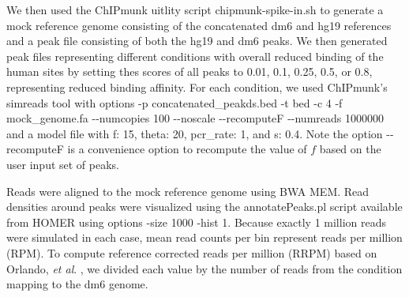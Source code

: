 \documentclass[12pt]{article}
\begin{document}
We then used the ChIPmunk uitlity script chipmunk-spike-in.sh to generate a mock reference genome consisting of the concatenated dm6 and hg19 references and a peak file consisting of both the hg19 and dm6 peaks. We then generated peak files representing different conditions with overall reduced binding of the human sites by setting thes scores of all peaks to 0.01, 0.1, 0.25, 0.5, or 0.8, representing reduced binding affinity.
For each condition, we used ChIPmunk's simreads tool with options -p concatenated\_peakds.bed -t bed -c 4 -f mock\_genome.fa -{}-numcopies 100 -{}-noscale -{}-recomputeF -{}-numreads 1000000 and a model file with f: 15, theta: 20, pcr\_rate: 1, and s: 0.4. Note the option -{}-recomputeF is a convenience option to recompute the value of $f$ based on the user input set of peaks.

Reads were aligned to the mock reference genome using BWA MEM. Read densities around peaks were visualized using the annotatePeaks.pl script available from HOMER \cite{HOMER} using options -size 1000 -hist 1.
Because exactly 1 million reads were simulated in each case, mean read counts per bin represent reads per million (RPM).
To compute reference corrected reads per million (RRPM) based on Orlando, \emph{et al}. \cite{spikein}, we divided each value by the number of reads from the condition mapping to the dm6 genome.



\end{document}
